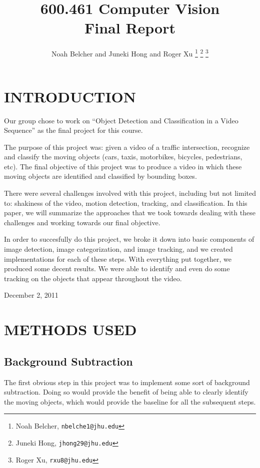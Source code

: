 \documentclass[a4paper, 10pt, conference]{ieeeconf}      %
\title{\LARGE \bf
600.461 Computer Vision\\Final Report
}
\author{Noah Belcher and Juneki Hong and Roger Xu%
\thanks{Noah Belcher,
        {\tt\small nbelche1@jhu.edu}}%
\thanks{Juneki Hong,
        {\tt\small jhong29@jhu.edu}}%
\thanks{Roger Xu,
		{\tt\small rxu8@jhu.edu}}%
}
\begin{document}
\maketitle
\thispagestyle{empty}
\pagestyle{empty}


\section{INTRODUCTION}

Our group chose to work on “Object Detection and Classification in a Video Sequence” as the final project for this course. \newline

The purpose of this project was: given a video of a traffic intersection, recognize and classify the moving objects (cars, taxis, motorbikes, bicycles, pedestrians, etc). The final objective of this project was to produce a video in which these moving objects are identified and classified by bounding boxes. \newline

There were several challenges involved with this project, including but not limited to: shakiness of the video, motion detection, tracking, and classification. In this paper, we will summarize the approaches that we took towards dealing with these challenges and working towards our final objective. \newline


In order to succesfully do this project, we broke it down into basic components of image detection, image categorization, and image tracking, and we created implementations for each of these steps. With everything put together, we produced some decent results. We were able to identify and even do some tracking on the objects that appear throughout the video. 


\hfill December 2, 2011


\section{METHODS USED}

\subsection{Background Subtraction}
The first obvious step in this project was to implement some sort of background subtraction. Doing so would provide the benefit of being able to clearly identify the moving objects, which would provide the baseline for all the subsequent steps. \newline
\end{document}
